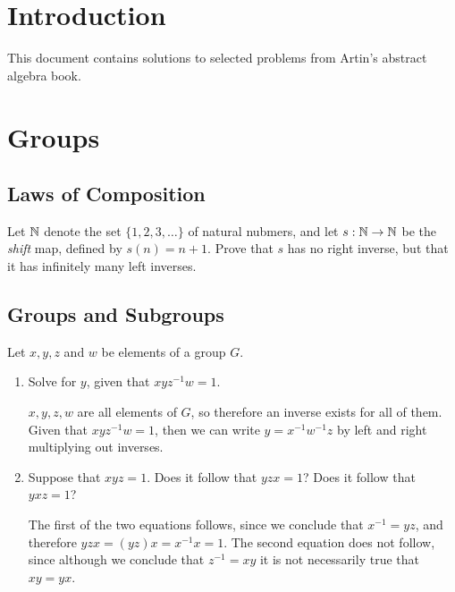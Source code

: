 \documentclass[10pt]{article}
\begin{document}
\section*{Introduction}
This document contains solutions to selected problems from Artin's abstract 
algebra book. 

\section{Groups}

\subsection{Laws of Composition}
\begin{problem}
	Let \( \mathbb N \) denote the set \( \{ 1, 2, 3, \dots\}  \) of natural nubmers, 
	and let \( s: \mathbb N \to \mathbb N \) be the \textit{shift} map, defined by \( s(n) = n +1 \). 
	Prove that \( s \) has no right inverse, but that it has 
	infinitely many left inverses. 
\end{problem}

\subsection{Groups and Subgroups}
\begin{problem}
	Let \( x, y, z \) and \( w \) be elements of a group \( G \). 
	\begin{enumerate}[label=\alph*)]
		\item Solve for \( y \), given that \( xyz^{-1}w = 1 \).
			
			\begin{solution}
				\( x, y, z, w \) are all elements of \( G \), so therefore an inverse 
				exists for all of them. Given that \( xyz^{-1} w = 1 \), then we can
				write \( y = x^{-1} w^{-1}z \) by left and right 
				multiplying out inverses.
			\end{solution}
		\item Suppose that \( xyz = 1 \). Does it follow that 
			\( yzx = 1 \)? Does it follow that \( yxz = 1 \)?

			\begin{solution}
				The first of the two equations follows, since we conclude that 
				\( x^{-1} = yz \), and therefore \( yzx = (yz)x = x^{-1} x = 1 \). 
				The second equation does not follow, since although we
				 conclude that \( z^{-1} = xy \) it is not necessarily 
				 true that \( xy = yx \). 
			\end{solution}
	\end{enumerate}
\end{problem}
\end{document}
